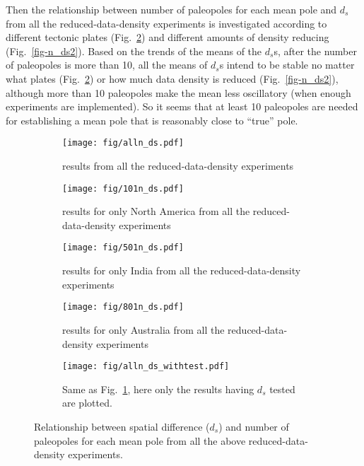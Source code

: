Then the relationship between number of paleopoles for each mean pole and $d_s$
from all the reduced-data-density experiments is investigated according to
different tectonic plates (Fig.~\ref{fig-n_ds}) and different amounts of density
reducing (Fig.~\ref{fig-n_ds2}). Based on the trends of the means of the $d_s$s,
after the number of paleopoles is more than 10, all the means of $d_s$s intend
to be stable no matter what plates (Fig.~\ref{fig-n_ds}) or how much data
density is reduced (Fig.~\ref{fig-n_ds2}), although more than 10 paleopoles make
the mean less oscillatory (when enough experiments are implemented). So it seems
that at least 10 paleopoles are needed for establishing a mean pole that is
reasonably close to ``true'' pole.

\begin{figure}
	\centering
	\begin{subfigure}{.49\textwidth}
		\texttt{[image: fig/alln\_ds.pdf]}
		\caption{results from all the reduced-data-density
		experiments}\label{fig-n_ds01}
	\end{subfigure}
	\begin{subfigure}{.49\textwidth}
		\texttt{[image: fig/101n\_ds.pdf]}
		\caption{results for only North America from all the reduced-data-density experiments}
	\end{subfigure}
	\begin{subfigure}{.49\textwidth}
		\texttt{[image: fig/501n\_ds.pdf]}
		\caption{results for only India from all the reduced-data-density experiments}
	\end{subfigure}
	\begin{subfigure}{.49\textwidth}
		\texttt{[image: fig/801n\_ds.pdf]}
		\caption{results for only Australia from all the reduced-data-density experiments}
	\end{subfigure}
	\begin{subfigure}{.49\textwidth}
		\texttt{[image: fig/alln\_ds\_withtest.pdf]}
		\caption{Same as Fig.~\ref{fig-n_ds01}, here only the results having
		$d_s$ tested are plotted.}
	\end{subfigure}
	\caption[ ]{Relationship between spatial difference ($d_s$) and number of
	paleopoles for each mean pole from all the above reduced-data-density
	experiments.}\label{fig-n_ds}
\end{figure}

